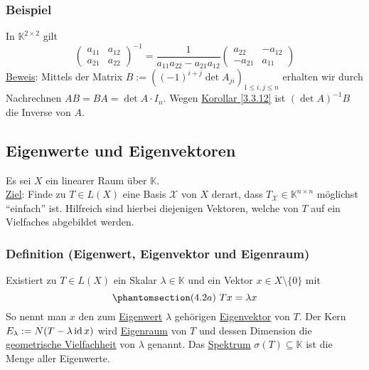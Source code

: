 \subsubsection{Beispiel}
In $\mathbb{K}^{2\times 2}$ gilt
\[\begin{pmatrix}a_{11} & a_{12}\\ a_{21} & a_{22}\end{pmatrix}^{-1}=\frac{1}{a_{11}a_{22}-a_{21}a_{12}}\begin{pmatrix}a_{22} & -a_{12}\\ -a_{21} & a_{11}\end{pmatrix}\]
\underline{Beweis}: Mittels der Matrix $B:=((-1)^{i+j}\det A_{ji})_{1\leq i,j\leq n}$ erhalten wir durch Nachrechnen $AB=BA=\det A\cdot I_n$.  Wegen \hyperref[3.3.12]{Korollar \ref{3.3.12}} ist $(\det A)^{-1}B$ die Inverse von $A$.
\subsection{Eigenwerte und Eigenvektoren}
Es sei $X$ ein linearer Raum über $\mathbb{K}$.\\
\underline{Ziel}: Finde zu $T\in L(X)$ eine Basis $\mathcal{X}$ von $X$ derart, dass $T_\mathcal{X}\in\mathbb{K}^{n\times n}$ möglichst "`einfach"' ist.  Hilfreich sind hierbei diejenigen Vektoren, welche von $T$ auf ein Vielfaches abgebildet werden.
\subsubsection{Definition (Eigenwert, Eigenvektor und Eigenraum)}
\label{4.2.1}
Existiert zu $T\in L(X)$ ein Skalar $\lambda\in\mathbb{K}$ und ein Vektor $x\in X\setminus \{0 \}$ mit
\[\phantomsection\label{4.2a}(4.2a)\ Tx=\lambda x\]
So nennt man $x$ den zum \underline{Eigenwert} $\lambda$ gehörigen \underline{Eigenvektor} von $T$.  Der Kern $E_\lambda := N(T-\lambda \operatorname{id} x)$ wird \underline{Eigenraum} von $T$ und dessen Dimension die \underline{geometrische Vielfachheit} von $\lambda$ genannt.  Das \underline{Spektrum} $\sigma (T)\subseteq \mathbb{K}$ ist die Menge aller Eigenwerte.
